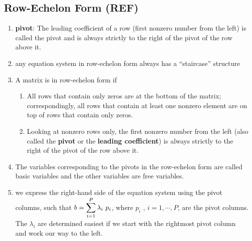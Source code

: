 \subsection{Row-Echelon Form (REF)}

\begin{enumerate}
    \item \textbf{pivot}: The leading coefficient of a row (first nonzero number from the left) is called the pivot and is always strictly to the right of the pivot of the row above it.
    \hfill \cite{mfml/book/mml/Deisenroth-Faisal-Ong}

    \item any equation system in row-echelon form always has a “staircase” structure
    \hfill \cite{mfml/book/mml/Deisenroth-Faisal-Ong}

    \item A matrix is in row-echelon form if
    \begin{enumerate}
        \item All rows that contain only zeros are at the bottom of the matrix; correspondingly, all rows that contain at least one nonzero element are on top of rows that contain only zeros.
        \hfill \cite{mfml/book/mml/Deisenroth-Faisal-Ong}

        \item Looking at nonzero rows only, the first nonzero number from the left (also called the \textbf{pivot} or the \textbf{leading coefficient}) is always strictly to the right of the pivot of the row above it.
        \hfill \cite{mfml/book/mml/Deisenroth-Faisal-Ong}
    \end{enumerate}

    \item The variables corresponding to the pivots in the row-echelon form are called basic variables and the other variables are free variables.
    \hfill \cite{mfml/book/mml/Deisenroth-Faisal-Ong}

    \item we express the right-hand side of the equation system using the pivot columns, such that $b = \displaystyle\sum^P_{i=1} \lambda_i\ p_i$, where $p_i$ , $i = 1, \cdots , P$, are the pivot columns. 
    \\
    The $\lambda_i$ are determined easiest if we start with the rightmost pivot column and work our way to the left.
    \hfill \cite{mfml/book/mml/Deisenroth-Faisal-Ong}

    
\end{enumerate}




